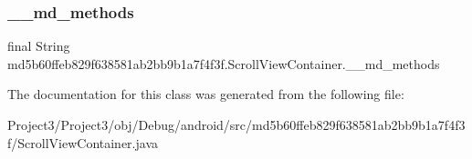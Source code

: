 \subsubsection{\texorpdfstring{\+\_\+\+\_\+md\+\_\+methods}{\_\_md\_methods}}
{\footnotesize\ttfamily final String md5b60ffeb829f638581ab2bb9b1a7f4f3f.\+Scroll\+View\+Container.\+\_\+\+\_\+md\+\_\+methods\hspace{0.3cm}{\ttfamily [static]}}



The documentation for this class was generated from the following file\+:\begin{DoxyCompactItemize}
\item 
Project3/\+Project3/obj/\+Debug/android/src/md5b60ffeb829f638581ab2bb9b1a7f4f3f/Scroll\+View\+Container.\+java\end{DoxyCompactItemize}
